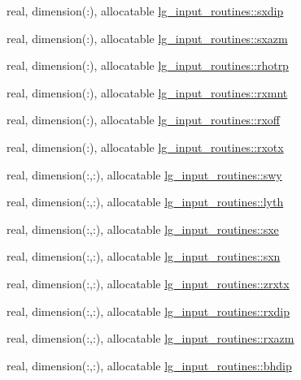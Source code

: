 \begin{DoxyCompactItemize}
\item 
real, dimension(\+:), allocatable \hyperlink{namespacelg__input__routines_a0588ff6b313bd15b75945a2d35c173db}{lg\+\_\+input\+\_\+routines\+::sxdip}
\item 
real, dimension(\+:), allocatable \hyperlink{namespacelg__input__routines_a0dc7ac3264785f849aef392afcad0d6f}{lg\+\_\+input\+\_\+routines\+::sxazm}
\item 
real, dimension(\+:), allocatable \hyperlink{namespacelg__input__routines_a07fda9e4a6dbe5d42ed0e9b3c264091f}{lg\+\_\+input\+\_\+routines\+::rhotrp}
\item 
real, dimension(\+:), allocatable \hyperlink{namespacelg__input__routines_a255b10823a2c6dd038b02a3231169307}{lg\+\_\+input\+\_\+routines\+::rxmnt}
\item 
real, dimension(\+:), allocatable \hyperlink{namespacelg__input__routines_a2a1492ae994dbca91f366a55332bff9c}{lg\+\_\+input\+\_\+routines\+::rxoff}
\item 
real, dimension(\+:), allocatable \hyperlink{namespacelg__input__routines_a34cfdcc89ce43b259ae52d8cc1cea8b6}{lg\+\_\+input\+\_\+routines\+::rxotx}
\item 
real, dimension(\+:,\+:), allocatable \hyperlink{namespacelg__input__routines_ad2996126165dbc2c167d12071aba2ae3}{lg\+\_\+input\+\_\+routines\+::swy}
\item 
real, dimension(\+:,\+:), allocatable \hyperlink{namespacelg__input__routines_ae72446e679c44a5600c61e76b9ecc278}{lg\+\_\+input\+\_\+routines\+::lyth}
\item 
real, dimension(\+:,\+:), allocatable \hyperlink{namespacelg__input__routines_a4c5444638308f4ad61ee85290944de7e}{lg\+\_\+input\+\_\+routines\+::sxe}
\item 
real, dimension(\+:,\+:), allocatable \hyperlink{namespacelg__input__routines_a4d38d40a5711f7d77f1b5edacd3a7d85}{lg\+\_\+input\+\_\+routines\+::sxn}
\item 
real, dimension(\+:,\+:), allocatable \hyperlink{namespacelg__input__routines_a5d82e200f9fb0c9f2aae521ab394c73b}{lg\+\_\+input\+\_\+routines\+::zrxtx}
\item 
real, dimension(\+:,\+:), allocatable \hyperlink{namespacelg__input__routines_af9635e4a563dcf0723d07f3d131805a0}{lg\+\_\+input\+\_\+routines\+::rxdip}
\item 
real, dimension(\+:,\+:), allocatable \hyperlink{namespacelg__input__routines_afde6f15754213bfa35bd69e1c934f9bc}{lg\+\_\+input\+\_\+routines\+::rxazm}
\item 
real, dimension(\+:,\+:), allocatable \hyperlink{namespacelg__input__routines_ad18dca12a7805ae624b71667a773a294}{lg\+\_\+input\+\_\+routines\+::bhdip}

\end{DoxyCompactItemize}
